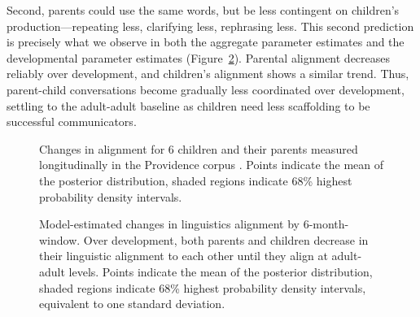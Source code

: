 \documentclass[10pt,letterpaper]{article}
\begin{document}
Second, parents could use the same words, but be less contingent on children's production---repeating less, clarifying less, rephrasing less. This second prediction is precisely what we observe in both the aggregate parameter estimates and the developmental parameter estimates (Figure~\ref{fig:all_hpds}). Parental alignment decreases reliably over development, and children's alignment shows a similar trend. Thus, parent-child conversations become gradually less coordinated over development, settling to the adult-adult baseline as children need less scaffolding to be successful communicators.


\begin{figure}[tb]
  \caption{\label{fig:providence_hpds} Changes in alignment for 6 children and their parents measured longitudinally in the Providence corpus \cite{demuth2006}. Points indicate the mean of the posterior distribution, shaded regions indicate 68\% highest probability density intervals.}
\end{figure}

\begin{figure}[tb]
	\caption{Model-estimated changes in linguistics alignment by 6-month-window. Over development, both parents and children decrease in their linguistic alignment to each other until they align at adult-adult levels. Points indicate the mean of the posterior distribution, shaded regions indicate 68\% highest probability density intervals, equivalent to one standard deviation.
\label{fig:all_hpds} }
\end{figure}
\end{document}

